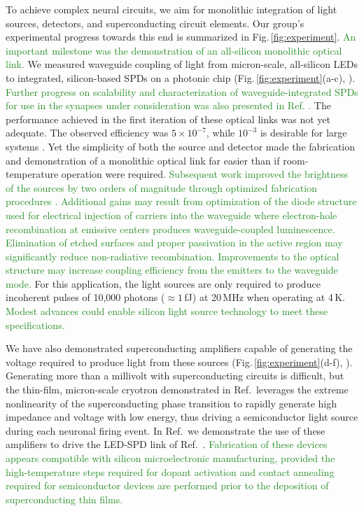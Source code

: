 \documentclass[twocolumn]{article}
\newcommand{\onlinecite}[1]{\hspace{-1 ex} \nocite{#1}\citenum{#1}}
\begin{document}
To achieve complex neural circuits, we aim for monolithic integration of light sources, detectors, and superconducting circuit elements. Our group's experimental progress towards this end is summarized in Fig.\,\ref{fig:experiment}. \textcolor{ForestGreen}{An important milestone was the demonstration of an all-silicon monolithic optical link.} We measured waveguide coupling of light from micron-scale, all-silicon LEDs to integrated, silicon-based SPDs on a  photonic chip (Fig.\,\ref{fig:experiment}(a-c), \cite{buch2017}). \textcolor{ForestGreen}{Further progress on scalability and characterization of waveguide-integrated SPDs for use in the synapses under consideration was also presented in Ref. \onlinecite{buta2020_2}.} The performance achieved in the first iteration of these optical links was not yet adequate. The observed efficiency was $5\times10^{-7}$, while $10^{-3}$ is desirable for large systems \cite{sh2019}. Yet the simplicity of both the source and detector made the fabrication and demonstration of a monolithic optical link far easier than if room-temperature operation were required. \textcolor{ForestGreen}{Subsequent work improved the brightness of the sources by two orders of magnitude through optimized fabrication procedures \cite{buta2020}. Additional gains may result from optimization of the diode structure used for electrical injection of carriers into the waveguide where electron-hole recombination at emissive centers produces waveguide-coupled luminescence. Elimination of etched surfaces and proper passivation in the active region may significantly reduce non-radiative recombination. Improvements to the optical structure may increase coupling efficiency from the emitters to the waveguide mode.} For this application, the light sources are only required to produce incoherent pulses of 10,000 photons ($\approx 1$\,fJ) at 20\,MHz when operating at 4\,K. \textcolor{ForestGreen}{Modest advances could enable silicon light source technology to meet these specifications.}

We have also demonstrated superconducting amplifiers capable of generating the voltage required to produce light from these sources (Fig.\,\ref{fig:experiment}(d-f), \cite{mcve2019}). Generating more than a millivolt with superconducting circuits is difficult, but the thin-film, micron-scale cryotron demonstrated in Ref.\,\onlinecite{mcve2019} leverages the extreme nonlinearity of the superconducting phase transition to rapidly generate high impedance and voltage with low energy, thus driving a semiconductor light source during each neuronal firing event. In Ref.\,\onlinecite{mcve2019} we demonstrate the use of these amplifiers to drive the LED-SPD link of Ref.\,\onlinecite{buch2017}. \textcolor{ForestGreen}{Fabrication of these devices appears compatible with silicon microelectronic manufacturing, provided the high-temperature steps required for dopant activation and contact annealing required for semiconductor devices are performed prior to the deposition of superconducting thin films.}
\end{document}
